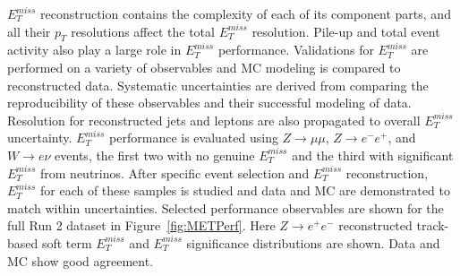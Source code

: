 $E_T^{miss}$ reconstruction contains the complexity of each of its component parts, and all their $p_T$ resolutions affect the total $E_T^{miss}$ resolution. Pile-up and total event activity also play a large role in $E_T^{miss}$ performance. Validations for $E_T^{miss}$ are performed on a variety of observables and MC modeling is compared to reconstructed data. Systematic uncertainties are derived from comparing the reproducibility of these observables and their successful modeling of data. Resolution for reconstructed jets and leptons are also propagated to overall $E_T^{miss}$ uncertainty. $E_T^{miss}$ performance is evaluated using $Z\rightarrow \mu\mu$, $Z\rightarrow e^-e^+$, and $W\rightarrow e\nu$ events, the first two with no genuine $E_T^{miss}$ and the third with significant $E_T^{miss}$ from neutrinos. After specific event selection and $E_T^{miss}$ reconstruction, $E_T^{miss}$ for each of these samples is studied and data and MC are demonstrated to match within uncertainties. Selected performance observables are shown for the full Run 2 dataset in Figure~\ref{fig:METPerf}. Here $Z\rightarrow e^+e^-$ reconstructed track-based soft term $E_T^{miss}$ and $E_T^{miss}$ significance distributions are shown. Data and MC show good agreement.

